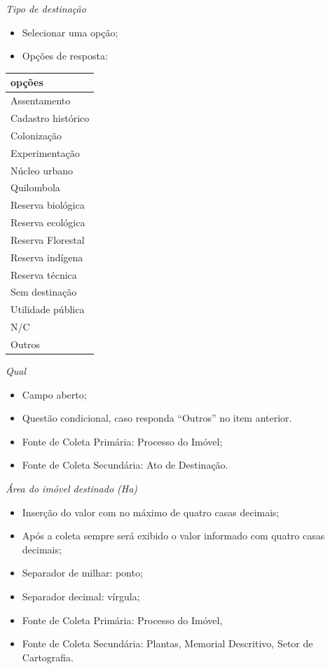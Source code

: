 \documentclass[
  letterpaper,
]{report}
\providecommand{\tightlist}{%
  \setlength{\itemsep}{0pt}\setlength{\parskip}{0pt}}\usepackage{longtable,booktabs,array}
\begin{document}
\emph{Tipo de destinação}

\begin{itemize}
\tightlist
\item
  Selecionar uma opção;
\item
  Opções de resposta:
\end{itemize}

\begin{longtable}[]{@{}l@{}}
\toprule()
opções \\
\midrule()
\endhead
Assentamento \\
Cadastro histórico \\
Colonização \\
Experimentação \\
Núcleo urbano \\
Quilombola \\
Reserva biológica \\
Reserva ecológica \\
Reserva Florestal \\
Reserva indígena \\
Reserva técnica \\
Sem destinação \\
Utilidade pública \\
N/C \\
Outros \\
\bottomrule()
\end{longtable}

\emph{Qual}

\begin{itemize}
\tightlist
\item
  Campo aberto;
\item
  Questão condicional, caso responda ``Outros'' no item anterior.
\item
  Fonte de Coleta Primária: Processo do Imóvel;
\item
  Fonte de Coleta Secundária: Ato de Destinação.
\end{itemize}

\emph{Área do imóvel destinado (Ha)}

\begin{itemize}
\tightlist
\item
  Inserção do valor com no máximo de quatro casas decimais;
\item
  Após a coleta sempre será exibido o valor informado com quatro casas
  decimais;
\item
  Separador de milhar: ponto;
\item
  Separador decimal: vírgula;
\item
  Fonte de Coleta Primária: Processo do Imóvel,
\item
  Fonte de Coleta Secundária: Plantas, Memorial Descritivo, Setor de
  Cartografia.
\end{itemize}
\end{document}
